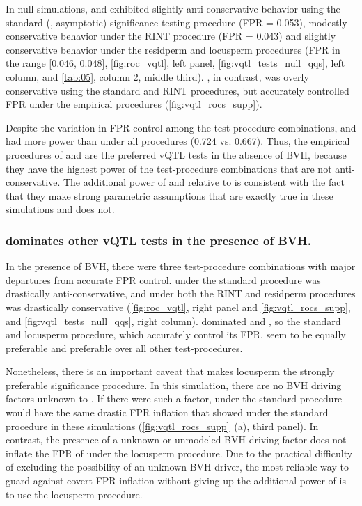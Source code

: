 In null simulations, \Caov and \DGLMv exhibited slightly anti-conservative behavior using the standard (\ie, asymptotic) significance testing procedure (FPR = 0.053), modestly conservative behavior under the RINT procedure (FPR = 0.043) and slightly conservative behavior under the residperm and locusperm procedures (FPR in the range [0.046, 0.048], \autoref{fig:roc_vqtl}, left panel, \autoref{fig:vqtl_tests_null_qqs}, left column, and \autoref{tab:05}, column 2, middle third).
\Lev, in contrast, was overly conservative using the standard and RINT procedures, but accurately controlled FPR under the empirical procedures (\autoref{fig:vqtl_rocs_supp}).

Despite the variation in FPR control among the test-procedure combinations, \Caov and \DGLMv had more power than \Lev under all procedures (0.724 vs. 0.667).
Thus, the empirical procedures of \Caov and \DGLMv are the preferred vQTL tests in the absence of BVH, because they have the highest power of the test-procedure combinations that are not anti-conservative.
The additional power of \Caov and \DGLMv relative to \Lev is consistent with the fact that they make strong parametric assumptions that are exactly true in these simulations and \Lev does not.

\subsubsection{\DGLMv dominates other vQTL tests in the presence of BVH.}

In the presence of BVH, there were three test-procedure combinations with major departures from accurate FPR control.
\Caov under the standard procedure was drastically anti-conservative, and \DGLMv under both the RINT and residperm procedures was drastically conservative (\autoref{fig:roc_vqtl}, right panel and \autoref{fig:vqtl_rocs_supp}, and \autoref{fig:vqtl_tests_null_qqs}, right column).
\DGLMv dominated \Lev and \Caov, so the standard and locusperm procedure, which accurately control its FPR, seem to be equally preferable and preferable over all other test-procedures.

Nonetheless, there is an important caveat that makes locusperm the strongly preferable significance procedure.
In this simulation, there are no BVH driving factors unknown to \DGLMv.
If there were such a factor, \DGLMv under the standard procedure would have the same drastic FPR inflation that \Caov showed under the standard procedure in these simulations (\autoref{fig:vqtl_rocs_supp}~(a), third panel).
In contrast, the presence of a unknown or unmodeled BVH driving factor does not inflate the FPR of \DGLMv under the locusperm procedure.
Due to the practical difficulty of excluding the possibility of an unknown BVH driver, the most reliable way to guard against covert FPR inflation without giving up the additional power of \DGLMv is to use the locusperm procedure.

